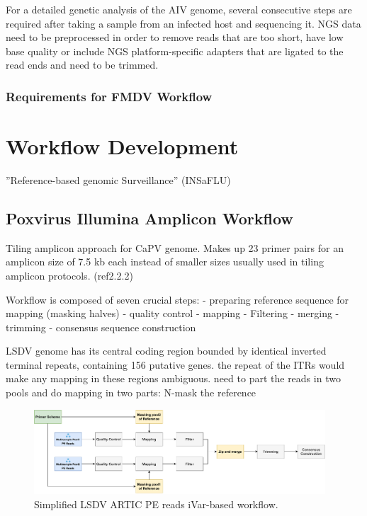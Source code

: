 For a detailed genetic analysis of the AIV genome, several consecutive steps are required after taking a sample from an infected host and sequencing it. NGS data need to be preprocessed in order to remove reads that are too short, have low base quality or include NGS platform-specific adapters that are ligated to the read ends and need to be trimmed.

\subsubsection{Requirements for FMDV Workflow}

\section{Workflow Development}
''Reference-based genomic Surveillance'' (INSaFLU)

\subsection{Poxvirus Illumina Amplicon Workflow}

Tiling amplicon approach for CaPV genome. Makes up 23 primer pairs for an amplicon size of 7.5 kb each instead of smaller sizes usually used in tiling amplicon protocols. (ref2.2.2)

Workflow is composed of seven crucial steps:
- preparing reference sequence for mapping (masking halves)
- quality control
- mapping
- Filtering
- merging
- trimming
- consensus sequence construction

LSDV genome has its central coding region bounded by identical inverted terminal repeats,
containing 156 putative genes. the repeat of the ITRs would make any mapping in these regions ambiguous.
need to part the reads in two pools and do mapping in two parts: N-mask the reference 

\begin{figure}
	\centering
	\includegraphics[width=0.97\textwidth]{media/3-pipelines-LSDV.pdf}
	\caption{Simplified LSDV ARTIC PE reads iVar-based workflow.}
	\label{fig:3-pipelines-lsdv}
\end{figure}


